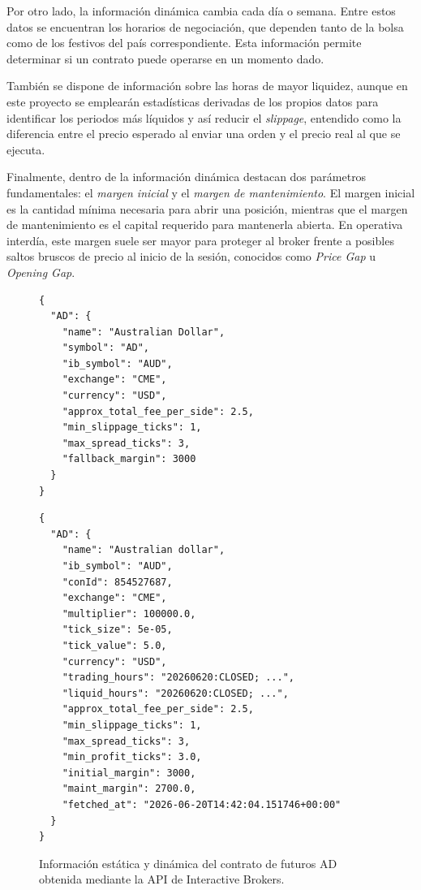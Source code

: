 Por otro lado, la información dinámica cambia cada día o semana. Entre estos datos se encuentran los horarios de negociación, que dependen tanto de la
bolsa como de los festivos del país correspondiente. Esta información permite determinar si un contrato puede operarse en un momento dado.

También se dispone de información sobre las horas de mayor liquidez, aunque en este proyecto se emplearán estadísticas derivadas de los propios datos para identificar los
periodos más líquidos y así reducir el \textit{slippage}, entendido como la diferencia entre el precio esperado al enviar una orden y el precio real
al que se ejecuta.

Finalmente, dentro de la información dinámica destacan dos parámetros fundamentales: el \textit{margen inicial} y el
\textit{margen de mantenimiento}. El margen inicial es la cantidad mínima necesaria para abrir una posición, mientras que el margen de mantenimiento
es el capital requerido para mantenerla abierta. En operativa interdía, este margen suele ser mayor para proteger al broker frente a posibles saltos
bruscos de precio al inicio de la sesión, conocidos como \textit{Price Gap} u \textit{Opening Gap}.

\begin{figure}[H]
\centering
\begin{minipage}[t]{0.48\textwidth}
\vspace{0pt}
\begin{verbatim}
{
  "AD": {
    "name": "Australian Dollar",
    "symbol": "AD",
    "ib_symbol": "AUD",
    "exchange": "CME",
    "currency": "USD",
    "approx_total_fee_per_side": 2.5,
    "min_slippage_ticks": 1,
    "max_spread_ticks": 3,
    "fallback_margin": 3000
  }
}
\end{verbatim}
\end{minipage}
\hfill
\begin{minipage}[t]{0.48\textwidth}
\vspace{0pt}
\begin{verbatim}
{
  "AD": {
    "name": "Australian dollar",
    "ib_symbol": "AUD",
    "conId": 854527687,
    "exchange": "CME",
    "multiplier": 100000.0,
    "tick_size": 5e-05,
    "tick_value": 5.0,
    "currency": "USD",
    "trading_hours": "20260620:CLOSED; ...",
    "liquid_hours": "20260620:CLOSED; ...",
    "approx_total_fee_per_side": 2.5,
    "min_slippage_ticks": 1,
    "max_spread_ticks": 3,
    "min_profit_ticks": 3.0,
    "initial_margin": 3000,
    "maint_margin": 2700.0,
    "fetched_at": "2026-06-20T14:42:04.151746+00:00"
  }
}
\end{verbatim}
\end{minipage}
\caption{Información estática y dinámica del contrato de futuros AD obtenida mediante la API de Interactive Brokers.}
\end{figure}

